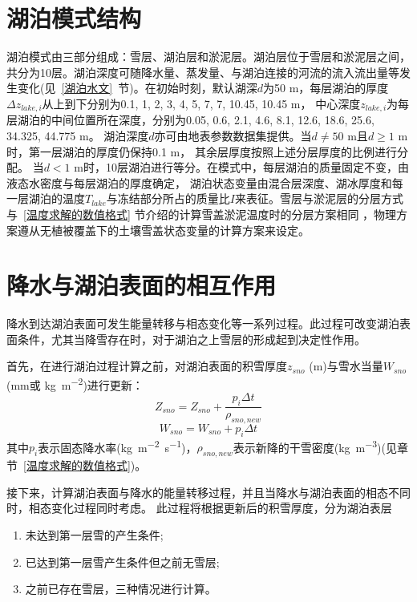 \section{湖泊模式结构}
湖泊模式由三部分组成：雪层、湖泊层和淤泥层。湖泊层位于雪层和淤泥层之间，
共分为10层。湖泊深度可随降水量、蒸发量、与湖泊连接的河流的流入流出量等发生变化(见~\ref{湖泊水文}~节)。在初始时刻，默认湖深$d$为50 m，每层湖泊的厚度$\Delta z_{lake,i}$从上到下分别为0.1, 1, 2, 3, 4, 5, 7, 7, 10.45, 10.45 m，
中心深度$z_{lake,i}$为每层湖泊的中间位置所在深度，分别为0.05, 0.6, 2.1, 4.6, 8.1, 12.6, 18.6, 25.6, 34.325, 44.775 m。
湖泊深度$d$亦可由地表参数数据集提供。当$d\neq50$ m且$d\geqslant 1$ m时，第一层湖泊的厚度仍保持0.1 m，
其余层厚度按照上述分层厚度的比例进行分配。
当$d<1$ m时，10层湖泊进行等分。在模式中，每层湖泊的质量固定不变，由液态水密度与每层湖泊的厚度确定，
湖泊状态变量由混合层深度、湖冰厚度和每一层湖泊的温度$T_{lake}$与冻结部分所占的质量比$I$来表征。雪层与淤泥层的分层方式与~\ref{温度求解的数值格式} 节介绍的计算雪盖淤泥温度时的分层方案相同
，物理方案遵从无植被覆盖下的土壤雪盖状态变量的计算方案来设定。


\section{降水与湖泊表面的相互作用}
降水到达湖泊表面可发生能量转移与相态变化等一系列过程。此过程可改变湖泊表面条件，尤其当降雪存在时，对于湖泊之上雪层的形成起到决定性作用。


首先，在进行湖泊过程计算之前，对湖泊表面的积雪厚度$z_{sno}$ (m)与雪水当量$W_{sno}$ (mm或 \unit{kg.m^{-2}})进行更新：
\begin{equation}
Z_{sno}=Z_{sno}+\frac{p_{i} \Delta t}{\rho_{sno,new}}
\end{equation}
\begin{equation}
W_{sno}=W_{sno}+p_{i} \Delta t
\end{equation}
其中$p_i$表示固态降水率(\unit{kg.m^{-2}.s^{-1}})，$\rho_{sno,new}$表示新降的干雪密度(\unit{kg.m^{-3}})(见章节~\ref{温度求解的数值格式})。

接下来，计算湖泊表面与降水的能量转移过程，并且当降水与湖泊表面的相态不同时，相态变化过程同时考虑。
此过程将根据更新后的积雪厚度，分为湖泊表层
\begin{enumerate}
    \item 未达到第一层雪的产生条件;
    \item 已达到第一层雪产生条件但之前无雪层;
    \item 之前已存在雪层，三种情况进行计算。
\end{enumerate}

